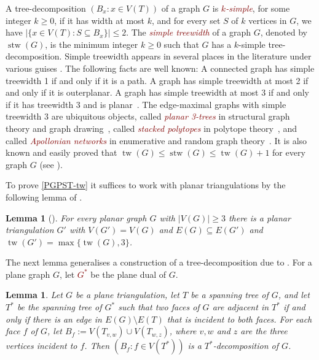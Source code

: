 \documentclass[11pt]{article}
\newcommand{\defn}[1]{\textcolor{Maroon}{\emph{#1}}}
\renewcommand{\geq}{\geqslant}
\renewcommand{\leq}{\leqslant}
\DeclareMathOperator{\stw}{stw}
\DeclareMathOperator{\tw}{tw}
\theoremstyle{plain}
\newtheorem{lem}[thm]{Lemma}
\theoremstyle{definition}
\begin{document}
		A tree-decomposition $(B_x:x\in V(T))$ of a graph $G$ is \defn{$k$-simple}, for some integer $k\geq 0$,  if it has  width  at most $k$, and for every set $S$ of $k$ vertices in $G$, we have $|\{x\in V(T): S\subseteq B_x\}|\leq 2$. The \defn{simple treewidth} of a graph $G$, denoted by $\stw(G)$, is the minimum integer $k\geq 0$ such that $G$ has a $k$-simple tree-decomposition. Simple treewidth appears in several places in the literature under various guises \citep{KU12,KV12,MJP06,Wulf16}. The following facts are well known: A connected graph has simple treewidth 1 if and only if it is a path. A graph has simple treewidth at most 2 if and only if it is outerplanar. A graph has simple treewidth at most 3 if and only if it has treewidth 3 and is planar~\citep{KV12}. The edge-maximal  graphs with simple treewidth 3 are ubiquitous objects, called  \defn{planar 3-trees} in structural graph theory and graph drawing~\citep{AP-SJADM96,KV12}, called \defn{stacked polytopes} in polytope theory~\citep{Chen16}, and called \defn{Apollonian networks} in enumerative and random graph theory~\citep{FT14}. It is also known and easily proved that $\tw(G) \leq \stw(G)\leq \tw(G)+1$ for every graph $G$ (see \citep{KU12,Wulf16}). 
		
		To prove \cref{PGPST-tw} it suffices to work with planar triangulations by the following lemma of \citet{BV13}.
		
		\begin{lem}[{\protect\citep[Lemma~1]{BV13}}]
			\label{Triangulate}
			For every planar graph $G$ with $|V(G)|\geq 3$ there is a planar triangulation $G'$ with $V(G')=V(G)$ and $E(G)\subseteq E(G')$ and $\tw(G')=\max\{\tw(G),3\}$.
		\end{lem}
		
		The next lemma generalises a construction of a tree-decomposition due to \citet{Eppstein99}. For a plane graph $G$, let \defn{$G^*$} be the plane dual of $G$.
		
		\begin{lem}
			\label{GenerateFromSpanningTree}    
			Let $G$ be a plane triangulation, let $T$ be a spanning tree of $G$, and let $T^*$ be the spanning tree of $G^*$ such that two faces of $G$ are adjacent in $T^*$ if and only if there is an edge in $E(G)\setminus E(T)$ that is incident to both faces. For each face $f$ of $G$, let $B_f:=V(T_{v,w})\cup V(T_{w,z})$, where $v,w$ and $z$ are the three vertices incident to $f$. Then $(B_f:f\in V(T^*))$ is a $T^*$-decomposition of $G$.
		\end{lem}
		
\end{document}
